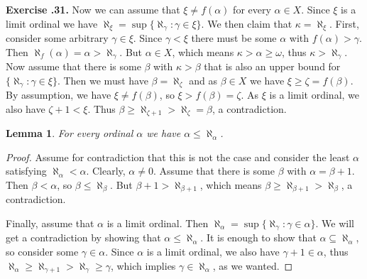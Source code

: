 \documentclass{report}
\newtheorem{lemma}{Lemma}[section]
\theoremstyle{definition}
\theoremstyle{remark}
\newenvironment{exc}[1]{\noindent\textbf{Exercise \thesection.#1.}}{\medskip}
\newcommand{\set}[1]{\{#1\}}
\begin{document}
\begin{exc}{31}
    Now we can assume that $\xi \neq f(\alpha)$ for every $\alpha \in X$. Since $\xi$ is a limit ordinal we have $\aleph_\xi = \sup\set{\aleph_\gamma : \gamma \in \xi}$. We then claim that $\kappa = \aleph_\xi$. First, consider some arbitrary $\gamma \in \xi$. Since $\gamma < \xi$ there must be some $\alpha$ with $f(\alpha) > \gamma$. Then $\aleph_f(\alpha) = \alpha > \aleph_\gamma$. But $\alpha \in X$, which means $\kappa > \alpha \geq \omega$, thus $\kappa > \aleph_\gamma$. Now assume that there is some $\beta$ with $\kappa > \beta$ that is also an upper bound for $\set{\aleph_\gamma : \gamma \in \xi}$. Then we must have $\beta = \aleph_\zeta$ and as $\beta \in X$ we have $\xi \geq \zeta = f(\beta)$. By assumption, we have $\xi \neq f(\beta)$, so $\xi > f(\beta) = \zeta$. As $\xi$ is a limit ordinal, we also have $\zeta + 1 < \xi$. Thus $\beta \geq \aleph_{\zeta + 1} > \aleph_\zeta = \beta$, a contradiction.
\end{exc}

\begin{lemma}\label{lem_aleph_ge}
    For every ordinal $\alpha$ we have $\alpha \le \aleph_\alpha$.
\end{lemma}

\begin{proof}
    Assume for contradiction that this is not the case and consider the least $\alpha$ satisfying $\aleph_\alpha < \alpha$. Clearly, $\alpha \neq 0$. Assume that there is some $\beta$ with $\alpha = \beta + 1$. Then $\beta < \alpha$, so $\beta \leq \aleph_\beta$. But $\beta + 1 > \aleph_{\beta + 1}$, which means $\beta \geq \aleph_{\beta+1} > \aleph_{\beta}$, a contradiction.
    
    Finally, assume that $\alpha$ is a limit ordinal. Then $\aleph_\alpha = \sup\set{\aleph_\gamma : \gamma \in \alpha}$. We will get a contradiction by showing that $\alpha \leq \aleph_\alpha$. It is enough to show that $\alpha \subseteq \aleph_\alpha$, so consider some $\gamma \in \alpha$. Since $\alpha$ is a limit ordinal, we also have $\gamma + 1 \in \alpha$, thus $\aleph_\alpha \geq \aleph_{\gamma + 1} > \aleph_{\gamma} \geq \gamma$, which implies $\gamma \in \aleph_\alpha$, as we wanted.
\end{proof}
\end{document}
